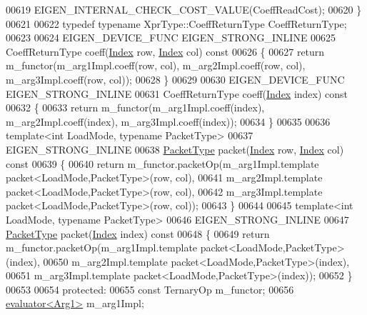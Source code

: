 \begin{DoxyCode}
00619     EIGEN\_INTERNAL\_CHECK\_COST\_VALUE(CoeffReadCost);
00620   \}
00621 
00622   \textcolor{keyword}{typedef} \textcolor{keyword}{typename} XprType::CoeffReturnType CoeffReturnType;
00623 
00624   EIGEN\_DEVICE\_FUNC EIGEN\_STRONG\_INLINE
00625   CoeffReturnType coeff(\hyperlink{namespace_eigen_a62e77e0933482dafde8fe197d9a2cfde}{Index} row, \hyperlink{namespace_eigen_a62e77e0933482dafde8fe197d9a2cfde}{Index} col)\textcolor{keyword}{ const}
00626 \textcolor{keyword}{  }\{
00627     \textcolor{keywordflow}{return} m\_functor(m\_arg1Impl.coeff(row, col), m\_arg2Impl.coeff(row, col), m\_arg3Impl.coeff(row, col));
00628   \}
00629 
00630   EIGEN\_DEVICE\_FUNC EIGEN\_STRONG\_INLINE
00631   CoeffReturnType coeff(\hyperlink{namespace_eigen_a62e77e0933482dafde8fe197d9a2cfde}{Index} index)\textcolor{keyword}{ const}
00632 \textcolor{keyword}{  }\{
00633     \textcolor{keywordflow}{return} m\_functor(m\_arg1Impl.coeff(index), m\_arg2Impl.coeff(index), m\_arg3Impl.coeff(index));
00634   \}
00635 
00636   \textcolor{keyword}{template}<\textcolor{keywordtype}{int} LoadMode, \textcolor{keyword}{typename} PacketType>
00637   EIGEN\_STRONG\_INLINE
00638   \hyperlink{struct_eigen_1_1_packet_type}{PacketType} packet(\hyperlink{namespace_eigen_a62e77e0933482dafde8fe197d9a2cfde}{Index} row, \hyperlink{namespace_eigen_a62e77e0933482dafde8fe197d9a2cfde}{Index} col)\textcolor{keyword}{ const}
00639 \textcolor{keyword}{  }\{
00640     \textcolor{keywordflow}{return} m\_functor.packetOp(m\_arg1Impl.template packet<LoadMode,PacketType>(row, col),
00641                               m\_arg2Impl.template packet<LoadMode,PacketType>(row, col),
00642                               m\_arg3Impl.template packet<LoadMode,PacketType>(row, col));
00643   \}
00644 
00645   \textcolor{keyword}{template}<\textcolor{keywordtype}{int} LoadMode, \textcolor{keyword}{typename} PacketType>
00646   EIGEN\_STRONG\_INLINE
00647   \hyperlink{struct_eigen_1_1_packet_type}{PacketType} packet(\hyperlink{namespace_eigen_a62e77e0933482dafde8fe197d9a2cfde}{Index} index)\textcolor{keyword}{ const}
00648 \textcolor{keyword}{  }\{
00649     \textcolor{keywordflow}{return} m\_functor.packetOp(m\_arg1Impl.template packet<LoadMode,PacketType>(index),
00650                               m\_arg2Impl.template packet<LoadMode,PacketType>(index),
00651                               m\_arg3Impl.template packet<LoadMode,PacketType>(index));
00652   \}
00653 
00654 \textcolor{keyword}{protected}:
00655   \textcolor{keyword}{const} TernaryOp m\_functor;
00656   \hyperlink{struct_eigen_1_1internal_1_1evaluator}{evaluator<Arg1>} m\_arg1Impl;

\end{DoxyCode}
